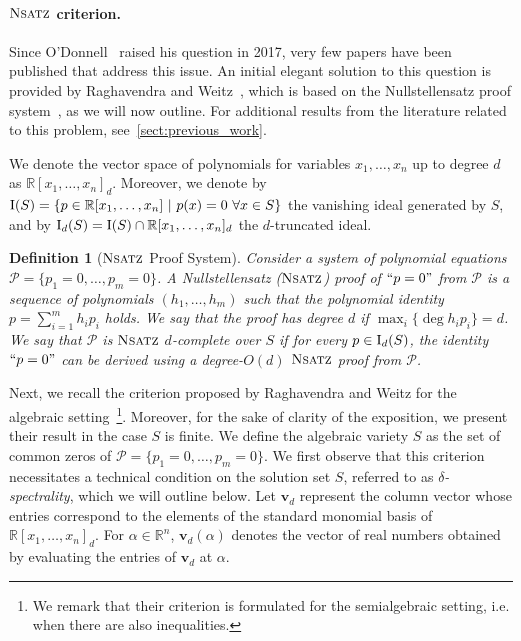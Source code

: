 \documentclass[11pt]{article}
\newcommand{\Nsatz}{\textsc{Nsatz}}
\newcommand{\I}{\emph{$\rm{I}$}}
\newcommand{\1}{\textbf{1}}
\newtheorem{definition}[theorem]{Definition}
\begin{document}
%
\paragraph{$\Nsatz$ criterion.}
Since O'Donnell~\cite{odonnell2017} raised his question in 2017, very few papers have been published that address this issue. An initial elegant solution to this question is provided by Raghavendra and Weitz~\cite{raghavendra_weitz2017}, which is based on the Nullstellensatz proof system~\cite{BeameIKPP94}, as we will now outline. For additional results from the literature related to this problem, see~\cref{sect:previous_work}.

We denote the vector space of polynomials for variables $x_1, \ldots, x_n$ up to degree $d$ as $\mathbb{R}[x_1, \dots, x_n]_d$. Moreover, we denote by $\I(S) = \{p \in \mathbb{R}[x_1,\ldots, x_n] \ | \ p(x) = 0 \  \forall x \in S\}$ the vanishing ideal generated by $S$, and by $\I_{d}(S) = \I(S) \cap \mathbb{R}[x_1, \ldots, x_n]_{d}$ the $d$-truncated ideal.  
\begin{definition}[$\Nsatz$ Proof System]\label{def:d-completeness}
    Consider a system of polynomial equations $\mathcal{P}=\{p_1=0,\ldots,p_m=0\}$. A \emph{Nullstellensatz ($\Nsatz$) proof} of $``p=0"$ from $\mathcal{P}$ is a sequence of polynomials $(h_1,\ldots,h_m)$ such that the polynomial identity $p=\sum_{i=1}^m h_ip_i$ holds. We say that the proof has degree $d$ if $\max_i\{\deg h_ip_i\}=d$.  We say that $\mathcal{P}$ is $\Nsatz$ \emph{$d$-complete} over $S$ if for every $p\in \I_{d}(S)$, the identity $``p=0"$ can be derived using a degree-$O(d)$ $\Nsatz$ proof from $\mathcal{P}$.
\end{definition}
Next, we recall the criterion proposed by Raghavendra and Weitz for the algebraic setting~\footnote{We remark that their criterion is formulated for the semialgebraic setting, i.e. when there are also inequalities.}. Moreover, for the sake of clarity of the exposition, we present their result in the case $S$ is finite. We define the algebraic variety \(S\) as the set of common zeros of \(\mathcal{P}=\{p_1=0,\ldots,p_m=0\}\). We first observe that this criterion necessitates a technical condition on the solution set \( S \), referred to as \emph{\(\delta\)-spectrality}, which we will outline below.
%
Let \(\mathbf{v}_d\) represent the column vector whose entries correspond to the elements of the standard monomial basis of \(\mathbb{R}[x_1, \dots, x_n]_d\). For \(\alpha \in \mathbb{R}^n\), \(\mathbf{v}_d(\alpha)\) denotes the vector of real numbers obtained by evaluating the entries of \(\mathbf{v}_d\) at \(\alpha\). 
\end{document}
